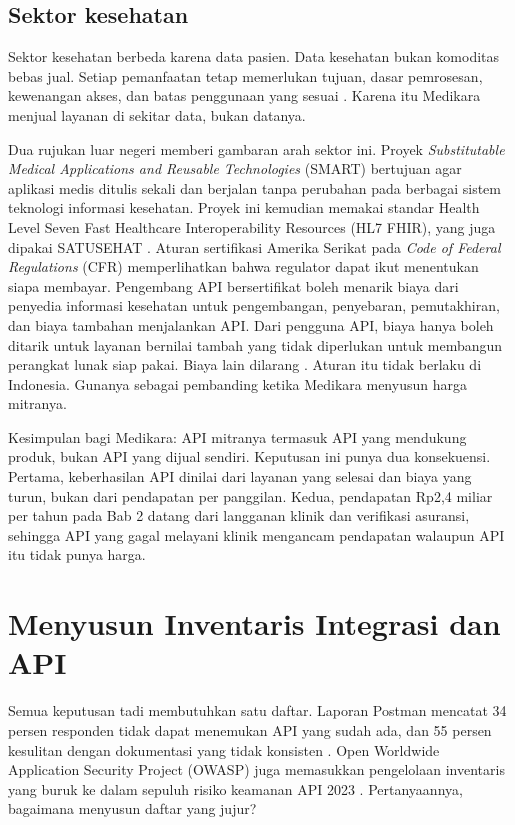 \subsection*{Sektor kesehatan}

Sektor kesehatan berbeda karena data pasien. Data kesehatan bukan komoditas bebas jual. Setiap pemanfaatan
tetap memerlukan tujuan, dasar pemrosesan, kewenangan akses, dan batas penggunaan yang sesuai
\cite{uu27-2022-pdp}. Karena itu Medikara menjual layanan di sekitar data, bukan datanya.

Dua rujukan luar negeri memberi gambaran arah sektor ini. Proyek \textit{Substitutable Medical Applications
and Reusable Technologies} (SMART) bertujuan agar aplikasi medis ditulis sekali dan berjalan tanpa perubahan
pada berbagai sistem teknologi informasi kesehatan. Proyek ini kemudian memakai standar Health Level Seven
Fast Healthcare Interoperability Resources (HL7 FHIR), yang juga dipakai SATUSEHAT \cite{c04-mandel2016smart, satusehat}. Aturan sertifikasi
Amerika Serikat pada \textit{Code of Federal Regulations} (CFR) memperlihatkan bahwa regulator dapat ikut
menentukan siapa membayar. Pengembang API bersertifikat boleh menarik biaya dari penyedia informasi
kesehatan untuk pengembangan, penyebaran, pemutakhiran, dan biaya tambahan menjalankan API. Dari pengguna API,
biaya hanya boleh ditarik untuk layanan bernilai tambah yang tidak diperlukan untuk membangun perangkat
lunak siap pakai. Biaya lain dilarang \cite{c04-cfr170-404}. Aturan itu tidak berlaku di Indonesia. Gunanya
sebagai pembanding ketika Medikara menyusun harga mitranya.

Kesimpulan bagi Medikara: API mitranya termasuk API yang mendukung produk, bukan API yang dijual sendiri.
Keputusan ini punya dua konsekuensi. Pertama, keberhasilan API dinilai dari layanan yang selesai dan
biaya yang turun, bukan dari pendapatan per panggilan. Kedua, pendapatan Rp2,4 miliar per tahun pada Bab 2
datang dari langganan klinik dan verifikasi asuransi, sehingga API yang gagal melayani klinik mengancam
pendapatan walaupun API itu tidak punya harga.

\section{Menyusun Inventaris Integrasi dan API}

Semua keputusan tadi membutuhkan satu daftar. Laporan Postman mencatat 34 persen responden tidak dapat
menemukan API yang sudah ada, dan 55 persen kesulitan dengan dokumentasi yang tidak konsisten
\cite{postman2025}. Open Worldwide Application Security Project (OWASP) juga memasukkan pengelolaan inventaris
yang buruk ke dalam sepuluh risiko keamanan API 2023 \cite{owasp-api2023}. Pertanyaannya, bagaimana menyusun
daftar yang jujur?

